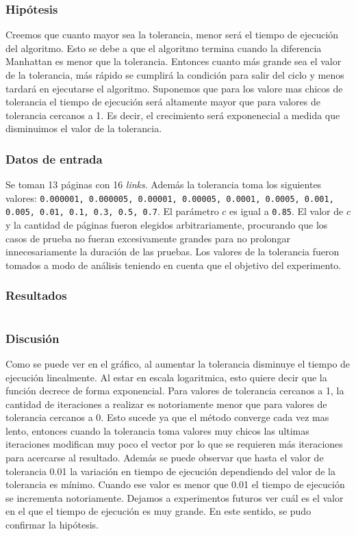 			\subsubsection*{Hipótesis} 
			Creemos que cuanto mayor sea la tolerancia, menor será el tiempo de ejecución del algoritmo. Esto se debe a que el algoritmo termina cuando la diferencia Manhattan es menor que la tolerancia. Entonces cuanto más grande sea el valor de la tolerancia, más rápido se cumplirá la condición para salir del ciclo y menos tardará en ejecutarse el algoritmo. Suponemos que para los valore mas chicos de tolerancia el tiempo de ejecución será altamente mayor que para valores de tolerancia cercanos a 1. Es decir, el crecimiento será exponenecial a medida que disminuimos el valor de la tolerancia.

			\subsubsection*{Datos de entrada} 
			Se toman 13 páginas con 16 \emph{links}. Además la tolerancia toma los siguientes valores: \texttt{0.000001, 0.000005, 0.00001, 0.00005, 0.0001, 0.0005, 0.001, 0.005, 0.01, 0.1, 0.3, 0.5, 0.7}. El parámetro $c$ es igual a \texttt{0.85}. El valor de $c$ y la cantidad de páginas fueron elegidos arbitrariamente, procurando que los casos de prueba no fueran excesivamente grandes para no prolongar innecesariamente la duración de las pruebas. Los valores de la tolerancia fueron tomados a modo de análisis teniendo en cuenta que el objetivo del experimento. 

			\subsubsection*{Resultados}
				{\centering \begin{tabular}{c}
			    \end{tabular}}

			\subsubsection*{Discusión}
			Como se puede ver en el gráfico, al aumentar la tolerancia disminuye el tiempo de ejecución linealmente. Al estar en escala logaritmica, esto quiere decir que la función decrece de forma exponencial. Para valores de tolerancia cercanos a 1, la cantidad de iteraciones a realizar es notoriamente menor que para valores de tolerancia cercanos a 0. Esto sucede ya que el método converge cada vez mas lento, entonces cuando la tolerancia toma valores muy chicos las ultimas iteraciones modifican muy poco el vector por lo que se requieren más iteraciones para acercarse al resultado.
			Además se puede observar que hasta el valor de tolerancia 0.01 la variación en tiempo de ejecución dependiendo del valor de la tolerancia es mínimo. Cuando ese valor es menor que 0.01 el tiempo de ejecución se incrementa notoriamente. Dejamos a experimentos futuros ver cuál es el valor en el que el tiempo de ejecución es muy grande. En este sentido, se pudo confirmar la hipótesis.   

